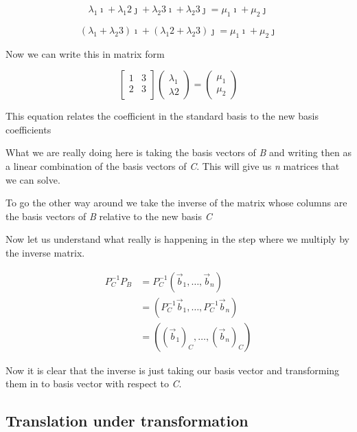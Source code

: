 \[
    \lambda_1 \imath + \lambda_1 2 \jmath + \lambda_2 3 \imath + \lambda_2 3 \jmath = \mu_1 \imath + \mu_2 \jmath 
\]

\[
    (\lambda_1  +  \lambda_2 3)\imath + (\lambda_1 2  + \lambda_2 3) \jmath = \mu_1 \imath + \mu_2 \jmath 
\]

Now we can write this in matrix form

\[
    \begin{bmatrix}
        1 & 3 \\
        2 & 3 \\
    \end{bmatrix} \begin{pmatrix}
        \lambda_1 \\ \lambda2
    \end{pmatrix} = \begin{pmatrix}
        \mu_1 \\ \mu_2
    \end{pmatrix}
\]

This equation relates the coefficient in the standard basis to the new basis
coefficients
\vspace{\baselineskip}

What we are really doing here is taking the basis vectors of \emph{B} and writing then as a linear combination
of the basis vectors of \emph{C}. This will give us \emph{n} matrices that we can solve.
\vspace{\baselineskip}

To go the other way around we take the inverse of the matrix whose columns are the basis vectors of \emph{B}
relative to the new basis \emph{C}
\vspace{\baselineskip}

Now let us understand what really is happening in the step where we multiply by the inverse matrix.

\begin{align*}
    P_{C}^{-1} P_B &= P_{C}^{-1}(\vec{b}_1, \dots, \vec{b}_n) \\
    &= (P_{C}^{-1}\vec{b}_1, \dots, P_{C}^{-1}\vec{b}_n)\\
    &= ({(\vec{b}_1)}_C, \dots, {(\vec{b}_n)}_C)
\end{align*}

Now it is clear that the inverse is just taking our basis vector and transforming
them in to basis vector with respect to \emph{C}.

\subsection{Translation under transformation}

